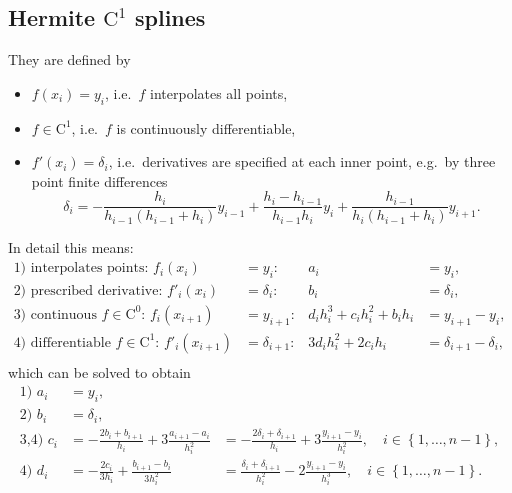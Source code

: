 \documentclass[11pt]{article}
\providecommand{\set}[1]{\left\{ #1 \right\}}
\providecommand{\set}[1]{\left\{ #1 \right\}}
\newcommand{\Co}{\mathrm{C}}
\theoremstyle{break}            %
\begin{document}
\subsection{Hermite $\Co^1$ splines}
They are defined by
\begin{itemize}
   \item $f(x_i) = y_i$, i.e.\ $f$ interpolates all points,
   \item $f\in\Co^1$, i.e.\ $f$ is continuously differentiable,
   \item $f'(x_i) = \delta_i$, i.e.\ derivatives are specified at each inner
       point, e.g.\ by three point finite differences
       \begin{equation*}
       \delta_i=-\frac{h_i}{h_{i-1}(h_{i-1} + h_i)} y_{i-1}
           + \frac{h_i-h_{i-1}}{h_{i-1} h_i} y_i
           + \frac{h_{i-1}}{h_i(h_{i-1} + h_i)} y_{i+1}.
       \end{equation*}
\end{itemize}
In detail this means:
\begin{equation*}
\begin{aligned}
    \text{1) interpolates points: } f_i(x_i) & = y_i: & 
    a_i & = y_i,\\
    \text{2) prescribed derivative: } f'_i(x_i) & = \delta_i: & 
    b_i & = \delta_i,\\
    \text{3) continuous } f\in\Co^0 \text{: } f_i(x_{i+1}) & =y_{i+1}: &
	d_i h_i^3 + c_i h_i^2 + b_i h_i & = y_{i+1}-y_i,\\
    \text{4) differentiable }f\in\Co^1 \text{: } f'_i(x_{i+1}) & =\delta_{i+1}: &
    3 d_i h_i^2 + 2 c_i h_i  & = \delta_{i+1}-\delta_i,\\
\end{aligned}
\end{equation*}
which can be solved to obtain
\begin{equation}
\label{eq:hermite_spline_coeffs}
\boxed{
\begin{aligned}
  \text{1) } a_i & =  y_i, \\
  \text{2) } b_i & =  \delta_i, \\
  \text{3,4) } c_i & = -\frac{2 b_i+b_{i+1}}{h_i}+3\frac{a_{i+1}-a_i}{h_i^2}
    & = -\frac{2\delta_i+\delta_{i+1}}{h_i} + 3 \frac{y_{i+1}-y_i}{h_i^2},
        \quad i\in\set{1,\dots,n-1},\\
  \text{4) } d_i & = -\frac{2 c_i}{3 h_i}+\frac{b_{i+1}-b_i}{3 h_i^2}
    & = \frac{\delta_i+\delta_{i+1}}{h_i^2}-2\frac{y_{i+1}-y_i}{h_i^3},
        \quad i\in\set{1,\dots,n-1}.
\end{aligned}
}
\end{equation}
\end{document}
